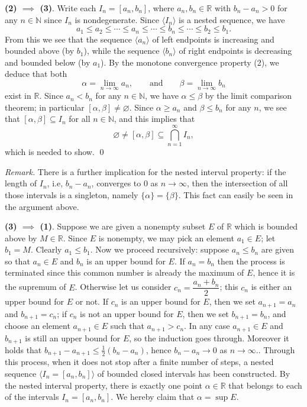 \noindent\textbf{(2) $\implies$ (3)}.
Write each $I_n = [a_n, b_n]$, where $a_n, b_n \in \mathbb{R}$ with $b_n - a_n > 0$ for any $n \in \mathbb{N}$ since $I_n$ is nondegenerate.
Since $\langle I_n \rangle$ is a nested sequence, we have
\[
  a_1 \leqslant a_2 \leqslant \cdots \leqslant a_n \leqslant \cdots \leqslant b_n \leqslant \cdots \leqslant b_2 \leqslant b_1.
\]
From this we see that the sequence $\langle a_n \rangle$ of left endpoints is increasing and bounded above (by $b_1$), while the sequence $\langle b_n \rangle$ of right endpoints is decreasing and bounded below (by $a_1$).
By the monotone convergence property (2), we deduce that both
\[
  \alpha = \lim_{n \to \infty} a_n, \qquad \text{and} \qquad
  \beta  = \lim_{n \to \infty} b_n
\]
exist in $\mathbb{R}$.
Since $a_n < b_n$ for any $n \in \mathbb{N}$, we have $\alpha \leqslant \beta$ by the limit comparison theorem; in particular $[\alpha, \beta] \ne \varnothing$.
Since $\alpha \geqslant a_n$ and $\beta \leqslant b_n$ for any $n$, we see that $[\alpha, \beta] \subseteq I_n$ for all $n \in \mathbb{N}$, and this implies that
\[
  \varnothing \ne [\alpha, \beta] \subseteq \bigcap_{n=1}^\infty I_n,
\]
which is needed to show. \qed

\noindent\textit{Remark.} There is a further implication for the nested interval property: if the length of $I_n$, i.e, $b_n - a_n$, converges to $0$ as $n \to \infty$, then the intersection of all those intervals is a singleton, namely $\{ \alpha \} = \{ \beta \}$.  This fact can easily be seen in the argument above.
  
\medskip
\noindent\textbf{(3) $\implies$ (1)}.
Suppose we are given a nonempty subset $E$ of $\mathbb{R}$ which is bounded above by $M \in \mathbb{R}$.
Since $E$ is nonempty, we may pick an element $a_1 \in E$; let $b_1 = M$.
Clearly $a_1 \leqslant b_1$.
Now we proceed recursively: suppose $a_n \leqslant b_n$ are given so that $a_n \in E$ and $b_n$ is an upper bound for $E$.
If $a_n = b_n$ then the process is terminated since this common number is already the maximum of $E$, hence it is the supremum of $E$.
Otherwise let us consider $c_n = \dfrac{a_n + b_n}{2}$; this $c_n$ is either an upper bound for $E$ or not.
If $c_n$ is an upper bound for $E$, then we set $a_{n+1} = a_n$ and $b_{n+1} = c_n$; if $c_n$ is not an upper bound for $E$, then we set $b_{n+1} = b_n$, and choose an element $a_{n+1} \in E$ such that $a_{n+1} > c_n$.
In any case $a_{n+1} \in E$ and $b_{n+1}$ is still an upper bound for $E$, so the induction goes through.
Moreover it holds that $b_{n+1} - a_{n+1} \leqslant \frac{1}{2} (b_n - a_n)$, hence $b_n - a_n \to 0$ as $n \to \infty$..
Through this process, when it does not stop after a finite number of steps, a nested sequence $\langle I_n = [a_n, b_n] \rangle$ of bounded closed intervals has been constructed.
By the nested interval property, there is exactly one point $\alpha \in \mathbb{R}$ that belongs to each of the intervals $I_n = [a_n, b_n]$.
We hereby claim that $\alpha = \sup E$.

